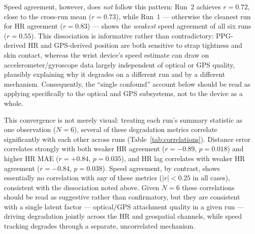 \documentclass{acmsiggraph}
\begin{document}
	Speed agreement, however, does \emph{not} follow this pattern: Run~2
	achieves $r=0.72$, close to the cross-run mean ($r=0.73$), while Run~1
	--- otherwise the cleanest run for HR agreement ($r=0.83$) --- shows the
	\emph{weakest} speed agreement of all six runs ($r=0.55$). This
	dissociation is informative rather than contradictory: PPG-derived HR and
	GPS-derived position are both sensitive to strap tightness and skin
	contact, whereas the wrist device's speed estimate can draw on
	accelerometer/gyroscope data largely independent of optical or GPS
	quality, plausibly explaining why it degrades on a different run and by
	a different mechanism. Consequently, the ``single confound'' account
	below should be read as applying specifically to the optical and GPS
	subsystems, not to the device as a whole.
	
	This convergence is not merely visual: treating each run's summary
	statistic as one observation ($N=6$), several of these degradation
	metrics correlate significantly with each other across runs
	(Table~\ref{tab:correlations}). Distance error correlates strongly with
	both weaker HR agreement ($r=-0.89$, $p=0.018$) and higher HR MAE
	($r=+0.84$, $p=0.035$), and HR lag correlates with weaker HR agreement
	($r=-0.84$, $p=0.038$). Speed agreement, by contrast, shows essentially
	no correlation with any of these metrics ($|r|<0.25$ in all cases),
	consistent with the dissociation noted above. Given $N=6$ these
	correlations should be read as suggestive rather than confirmatory, but
	they are consistent with a single latent factor --- optical/GPS
	attachment quality in a given run --- driving degradation jointly across
	the HR and geospatial channels, while speed tracking degrades through a
	separate, uncorrelated mechanism.
	
\end{document}
